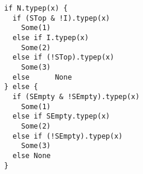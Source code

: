 \begin{lstlisting}[style=scalaioScala]
if N.typep(x) {
  if (STop & !I).typep(x)
    Some(1)
  else if I.typep(x)
    Some(2)
  else if (!STop).typep(x)
    Some(3)
  else      None
} else {
  if (SEmpty & !SEmpty).typep(x)
    Some(1)
  else if SEmpty.typep(x)
    Some(2)
  else if (!SEmpty).typep(x)
    Some(3)
  else None
}
\end{lstlisting}
